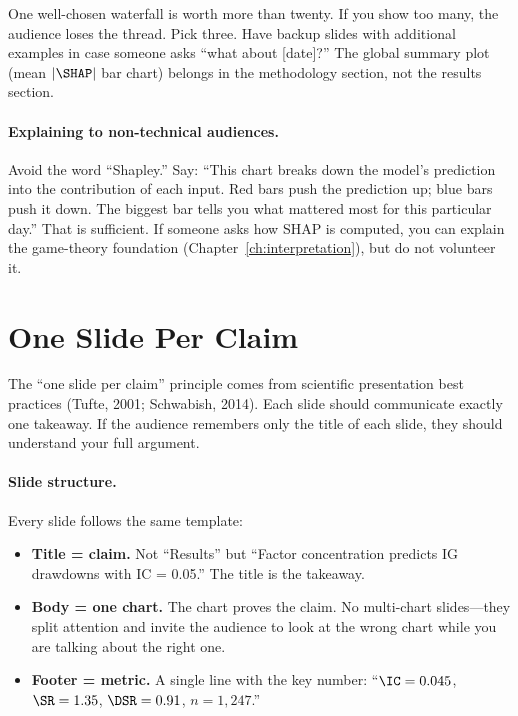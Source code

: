 \begin{warning}
One well-chosen waterfall is worth more than twenty.  If you show too many,
the audience loses the thread.  Pick three.  Have backup slides with
additional examples in case someone asks ``what about [date]?''  The
global summary plot (mean $|\SHAP|$ bar chart) belongs in the methodology
section, not the results section.
\end{warning}

\paragraph{Explaining to non-technical audiences.}
Avoid the word ``Shapley.''  Say: ``This chart breaks down the model's
prediction into the contribution of each input.  Red bars push the
prediction up; blue bars push it down.  The biggest bar tells you what
mattered most for this particular day.''  That is sufficient.  If someone
asks how SHAP is computed, you can explain the game-theory foundation
(Chapter~\ref{ch:interpretation}), but do not volunteer it.

\section{One Slide Per Claim}
\label{sec:presenting:slides}

\begin{prereq}
The ``one slide per claim'' principle comes from scientific presentation
best practices (Tufte, 2001; Schwabish, 2014).  Each slide should
communicate exactly one takeaway.  If the audience remembers only the
title of each slide, they should understand your full argument.
\end{prereq}

\paragraph{Slide structure.}
Every slide follows the same template:

\begin{itemize}[leftmargin=1.5em]
  \item \textbf{Title = claim.}  Not ``Results'' but ``Factor
    concentration predicts IG drawdowns with IC = 0.05.''  The title is
    the takeaway.
  \item \textbf{Body = one chart.}  The chart proves the claim.  No
    multi-chart slides---they split attention and invite the audience to
    look at the wrong chart while you are talking about the right one.
  \item \textbf{Footer = metric.}  A single line with the key number:
    ``$\IC = 0.045$, $\SR = 1.35$, $\DSR = 0.91$, $n = 1{,}247$.''
\end{itemize}

